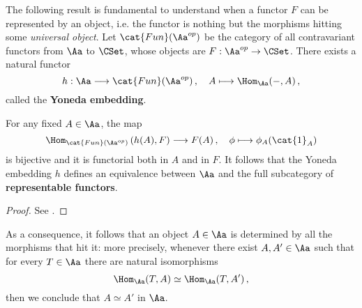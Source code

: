 The following result is fundamental to understand
when a functor $F$ can be represented by an object,
i.e. the functor is nothing but the morphisms hitting
some \emph{universal object}.
Let $\cat{Fun}(\Aa^{op})$ be the category of all
contravariant functors from $\Aa$ to $\CSet$,
whose objects are $F : \Aa^{op} \to \CSet$.
There exists a natural functor
\begin{equation*}
    h : \Aa \longrightarrow \cat{Fun}(\Aa^{op})\,,
    \quad A \longmapsto \Hom_{\Aa}(-,A)\,,
\end{equation*}
called the \textbf{Yoneda embedding}.

\begin{thm}\label{yoneda}
    For any fixed $A \in \Aa$, the map 
    \begin{equation*}
        \Hom_{\cat{Fun}(\Aa^{op})}\left( h(A), F \right)
        \longrightarrow F(A)\,, \quad
        \phi \longmapsto \phi_{A}(\cat{1}_{A})
    \end{equation*}
    is bijective and it is functorial
    both in $A$ and in $F$.
    It follows that the Yoneda embedding $h$ defines 
    an equivalence between $\Aa$ and the full subcategory 
    of \textbf{representable functors}.

    \begin{proof}
        See \parencite{riehl}.
    \end{proof}
\end{thm}

As a consequence, it follows that an object $A \in \Aa$ is
determined by all the morphisms that hit it: more
precisely, whenever there exist $A,A' \in \Aa$ such that
for every $T \in \Aa$ there are natural isomorphisms
\begin{equation*}
    \Hom_{\Aa}(T,A) \simeq \Hom_{\Aa}(T,A')\,,
\end{equation*}
then we conclude that $A \simeq A'$ in $\Aa$.